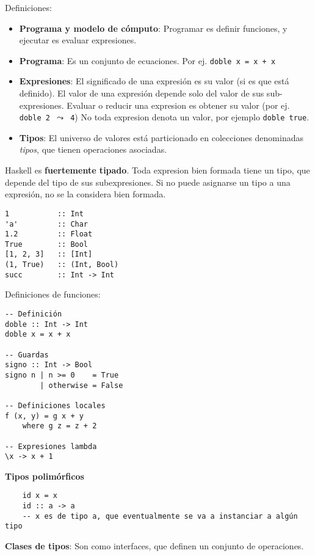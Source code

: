 \documentclass{report}
\theoremstyle{definition} %
\begin{document}
Definiciones:

\begin{itemize}
    \item \textbf{Programa y modelo de cómputo}: Programar es definir
    funciones, y ejecutar es evaluar expresiones.
    \item \textbf{Programa}: Es un conjunto de ecuaciones. Por ej.
    \texttt{doble x = x + x}
    \item \textbf{Expresiones}: El significado de una expresión es su valor
    (si es que está definido). El valor de una expresión depende solo del
    valor de sus sub-expresiones. Evaluar o reducir una expresion es obtener
    su valor (por ej. \texttt{doble 2 $\leadsto$ 4})
    No toda expresion denota un valor, por ejemplo \texttt{doble true}.
    \item \textbf{Tipos}: El universo de valores está particionado en
    colecciones denominadas \textit{tipos}, que tienen operaciones asociadas.
\end{itemize}

Haskell es \textbf{fuertemente tipado}. Toda expresion bien formada tiene un
tipo, que depende del tipo de sus subexpresiones. Si no puede asignarse un tipo
a una expresión, no se la considera bien formada.

\begin{verbatim}
1           :: Int
'a'         :: Char
1.2         :: Float
True        :: Bool
[1, 2, 3]   :: [Int]
(1, True)   :: (Int, Bool)
succ        :: Int -> Int
\end{verbatim}

Definiciones de funciones:

\begin{verbatim}
-- Definición
doble :: Int -> Int
doble x = x + x

-- Guardas
signo :: Int -> Bool
signo n | n >= 0    = True
        | otherwise = False

-- Definiciones locales
f (x, y) = g x + y
    where g z = z + 2

-- Expresiones lambda
\x -> x + 1
\end{verbatim}

\textbf{Tipos polimórficos}

\begin{verbatim}
    id x = x
    id :: a -> a
    -- x es de tipo a, que eventualmente se va a instanciar a algún tipo
\end{verbatim}

\textbf{Clases de tipos}: Son como interfaces, que definen un conjunto de
operaciones.
\end{document}
